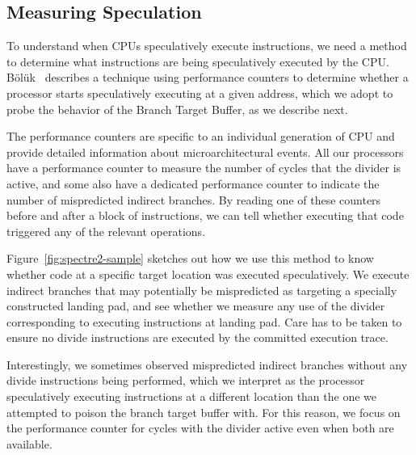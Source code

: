\subsection{Measuring Speculation}

To understand when CPUs speculatively execute instructions, we need a
method to determine what instructions are being speculatively executed
by the CPU.  Bölük~\cite{speculating-x86} describes a technique using
performance counters to determine whether a processor starts
speculatively executing at a given address, which we adopt to probe
the behavior of the Branch Target Buffer, as we describe next.

The performance counters are specific to an individual generation of CPU and provide detailed information about microarchitectural events.
All our processors have a performance counter to measure the number of cycles that the divider is active, and some also have a dedicated performance counter to indicate the number of mispredicted indirect branches.
By reading one of these counters before and after a block of instructions, we can tell whether executing that code triggered any of the relevant operations.

Figure~\ref{fig:spectre2-sample} sketches out how we use this method to know whether code at a specific target location was executed speculatively.
We execute indirect branches that may potentially be mispredicted as targeting a specially constructed landing pad, and see whether we measure any use of the divider corresponding to executing instructions at landing pad.
Care has to be taken to ensure no divide instructions are executed by the committed execution trace.

Interestingly, we sometimes observed mispredicted indirect branches without any divide instructions being performed, which we interpret as the processor speculatively executing instructions at a different location than the one we attempted to poison the branch target buffer with.
For this reason, we focus on the performance counter for cycles with the divider active even when both are available.



